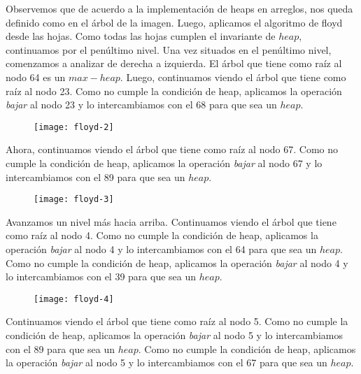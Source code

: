 \documentclass[10pt,a4paper]{article}
\begin{document}
\newline
\newline
Observemos que de acuerdo a la implementación de heaps en arreglos, nos queda definido como en el árbol de la imagen. 
\newline
\newline
Luego, aplicamos el algoritmo de floyd desde las hojas. Como todas las hojas cumplen el invariante de $heap$, continuamos por el penúltimo nivel.
\newline
\newline
Una vez situados en el penúltimo nivel, comenzamos a analizar de derecha a izquierda.
\newline
\newline
El árbol que tiene como raíz al nodo 64 es un $max-heap$.
\newpage
Luego, continuamos viendo el árbol que tiene como raíz al nodo 23. Como no cumple la condición de heap, aplicamos la operación \textit{bajar} al nodo 23 y lo intercambiamos con el 68 para que sea un $heap$.
\newline
\begin{figure}[h]
	\centering
\texttt{[image: floyd-2]}
	\label{drivers1}
\end{figure}
\newline
\newline
Ahora, continuamos viendo el árbol que tiene como raíz al nodo 67. Como no cumple la condición de heap, aplicamos la operación \textit{bajar} al nodo 67 y lo intercambiamos con el 89 para que sea un $heap$.
\newline
\begin{figure}[h]
	\centering
\texttt{[image: floyd-3]}
	\label{drivers1}
\end{figure}
\newpage
Avanzamos un nivel más hacia arriba. Continuamos viendo el árbol que tiene como raíz al nodo 4. Como no cumple la condición de heap, aplicamos la operación \textit{bajar} al nodo 4 y lo intercambiamos con el 64 para que sea un $heap$. Como no cumple la condición de heap, aplicamos la operación \textit{bajar} al nodo 4 y lo intercambiamos con el 39 para que sea un $heap$.
\newline
\begin{figure}[h]
	\centering
\texttt{[image: floyd-4]}
	\label{drivers1}
\end{figure}
\newline
\newline
Continuamos viendo el árbol que tiene como raíz al nodo 5. Como no cumple la condición de heap, aplicamos la operación \textit{bajar} al nodo 5 y lo intercambiamos con el 89 para que sea un $heap$. Como no cumple la condición de heap, aplicamos la operación \textit{bajar} al nodo 5 y lo intercambiamos con el 67 para que sea un $heap$.
\end{document}
